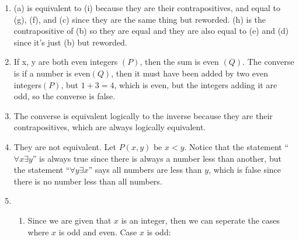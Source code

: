 \documentclass[12pt]{article}
\begin{document}
\begin{enumerate}
	\item (a) is equivalent to (i) because they are their contrapositives, and
	      equal to (g), (f), and (c) since they are the same thing but reworded.
	      (h) is the contrapositive of (b) so they are equal and
	      they are also equal to (e) and (d) since it's just (b) but reworded.
	\item If x, y are both even integers $(P)$, then the sum is even $(Q)$. The converse
	      is if a number is even$(Q)$, then it must have been added by two even
	      integers$(P)$, but $1 + 3 = 4$, which is even, but the integers adding it 
          are odd, so the converse is false.
	\item The converse is equivalent logically to the inverse because they are their
	      contrapositives, which are always logically equivalent.
	\item They are not equivalent. Let $P(x,y)$ be $x < y$. Notice that the statement
	      ``$\forall x \exists y$'' is always true since there is always a number less
	      than another, but the statement ``$\forall y \exists x$'' says all numbers are
	      less than $y$, which is false since there is no number less than all numbers.
	\item
	      \begin{enumerate}
		      \item Since we are given that $x$ is an integer, then we can seperate the cases where
		            $x$ is odd and even. \newline Case $x$ is odd:


\end{enumerate}
\end{enumerate}
\end{document}

